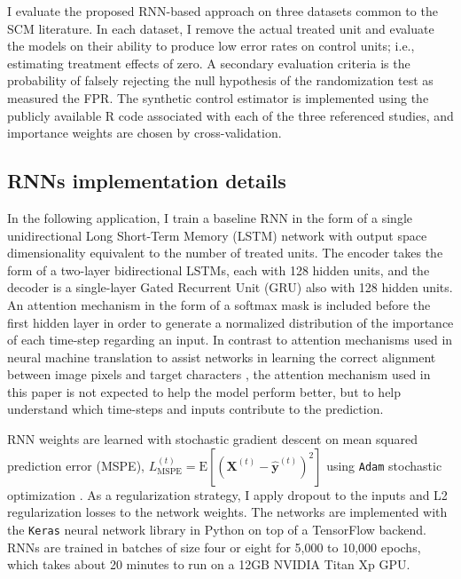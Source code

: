 \documentclass[hidelinks,12pt]{article}
\newcommand{\E}{\mathrm{E}}
\begin{document}
I evaluate the proposed RNN-based approach on three datasets common to the SCM literature. In each dataset, I remove the actual treated unit and evaluate the models on their ability to produce low error rates on control units; i.e., estimating treatment effects of zero. A secondary evaluation criteria is the probability of falsely rejecting the null hypothesis of the randomization test as measured the FPR. The synthetic control estimator is implemented using the publicly available \textsf{R} code associated with each of the three referenced studies, and importance weights are chosen by cross-validation. 

\subsection{RNNs implementation details}

In the following application, I train a baseline RNN in the form of a single unidirectional Long Short-Term Memory (LSTM) network \citep{schmidhuber1997long} with output space dimensionality equivalent to the number of treated units. The encoder takes the form of a two-layer bidirectional LSTMs, each with 128 hidden units, and the decoder is a single-layer Gated Recurrent Unit (GRU) \citep{chung2014} also with 128 hidden units. An attention mechanism in the form of a softmax mask is included before the first hidden layer in order to generate a normalized distribution of the importance of each time-step regarding an input. In contrast to attention mechanisms used in neural machine translation to assist networks in learning the correct alignment between image pixels and target characters \citep{cho2014learning,2017arXiv171204046P}, the attention mechanism used in this paper is not expected to help the model perform better, but to help understand which time-steps and inputs contribute to the prediction.

RNN weights are learned with stochastic gradient descent on mean squared prediction error (MSPE), $L^{(t)}_{\text{MSPE}} = \E \left[\left(\mathbf{X}^{(t)} - \mathbf{\hat{y}}^{(t)} \right)^2 \right]$ using \texttt{Adam} stochastic optimization \citep{kingma2014adam}. As a regularization strategy, I apply dropout to the inputs and L2 regularization losses to the network weights. The networks are implemented with the \texttt{Keras} neural network library \citep{chollet2015keras} in Python on top of a TensorFlow backend. RNNs are trained in batches of size four or eight for 5,000 to 10,000 epochs, which takes about 20 minutes to run on a 12GB NVIDIA Titan Xp GPU.
\end{document}
